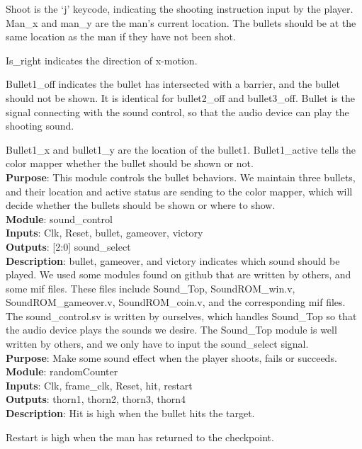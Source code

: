 \documentclass[12pt]{article}
\begin{document}
Shoot is the ‘j’ keycode, indicating the shooting instruction input by the player. 
Man\_x and man\_y are the man’s current location. The bullets should be at the same location as the man if they have not been shot.

Is\_right indicates the direction of x-motion.

Bullet1\_off indicates the bullet has intersected with a barrier, and the bullet should not be shown. It is identical for bullet2\_off and bullet3\_off.
Bullet is the signal connecting with the sound control, so that the audio device can play the shooting sound.

Bullet1\_x and bullet1\_y are the location of the bullet1. Bullet1\_active tells the color mapper whether the bullet should be shown or not. \\ 
\textbf{Purpose}: This module controls the bullet behaviors. We maintain three bullets, and their location and active status are sending to the color mapper, which will decide whether the bullets should be shown or where to show. \\

\textbf{Module}: sound\_control \\ 
\textbf{Inputs}: Clk, Reset, bullet, gameover, victory \\ 
\textbf{Outputs}: [2:0] sound\_select \\
\textbf{Description}: bullet, gameover, and victory indicates which sound should be played. We used some modules found on github that are written by others, and some mif files. These files include Sound\_Top, SoundROM\_win.v, SoundROM\_gameover.v, SoundROM\_coin.v, and the corresponding mif files. The sound\_control.sv is written by ourselves, which handles Sound\_Top so that the audio device plays the sounds we desire. The Sound\_Top module is well written by others, and we only have to input the sound\_select signal. \\ 
\textbf{Purpose}: Make some sound effect when the player shoots, fails or succeeds. \\

\textbf{Module}: randomCounter \\ 
\textbf{Inputs}: Clk, frame\_clk, Reset, hit, restart \\ 
\textbf{Outputs}: thorn1, thorn2, thorn3, thorn4 \\
\textbf{Description}: Hit is high when the bullet hits the target. 

Restart is high when the man has returned to the checkpoint. 
\end{document}
